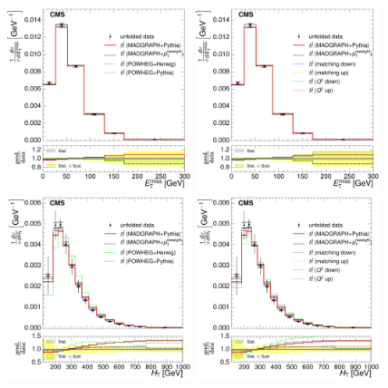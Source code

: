 \begin{figure}[hbtp]
    \centering
     \includegraphics[width=0.48\textwidth]{Chapters/04_Analysis/04b_XSections/images/results/fit/7TeV/MET/central/normalised_xsection_combined_different_generators.pdf}\hfill
     \includegraphics[width=0.48\textwidth]{Chapters/04_Analysis/04b_XSections/images/results/fit/7TeV/MET/central/normalised_xsection_combined_systematics_shifts.pdf}\\
     \includegraphics[width=0.48\textwidth]{Chapters/04_Analysis/04b_XSections/images/results/fit/7TeV/HT/central/normalised_xsection_combined_different_generators.pdf}\hfill
     \includegraphics[width=0.48\textwidth]{Chapters/04_Analysis/04b_XSections/images/results/fit/7TeV/HT/central/normalised_xsection_combined_systematics_shifts.pdf}\\

\end{figure}
